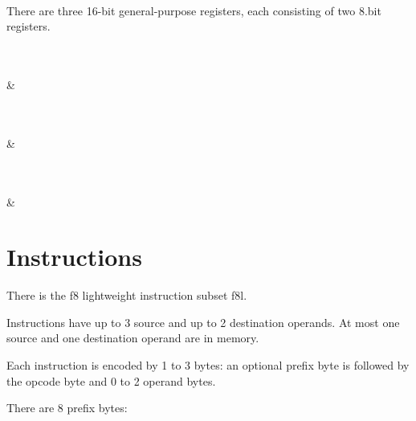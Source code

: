 \documentclass{book}
\begin{document}
\vspace{3mm}
\begin{bytefield}[bitwidth=0.025\linewidth]{16}
	 \\
\end{bytefield}

There are three 16-bit general-purpose registers, each consisting of two 8.bit registers.

\vspace{3mm}
\begin{bytefield}[bitwidth=0.025\linewidth]{16}
	 \\
	 \\
	 &
\end{bytefield}

\vspace{3mm}
\begin{bytefield}[bitwidth=0.025\linewidth]{16}
	 \\
	 \\
	 &
\end{bytefield}

\vspace{3mm}
\begin{bytefield}[bitwidth=0.025\linewidth]{16}
	 \\
	 \\
	 &
\end{bytefield}

\section{Instructions}

There is the f8 lightweight instruction subset f8l.

Instructions have up to 3 source and up to 2 destination operands. At most one source and one destination operand are in memory.

Each instruction is encoded by 1 to 3 bytes: an optional prefix byte is followed by the opcode byte and 0 to 2 operand bytes.

There are 8 prefix bytes:
\end{document}
